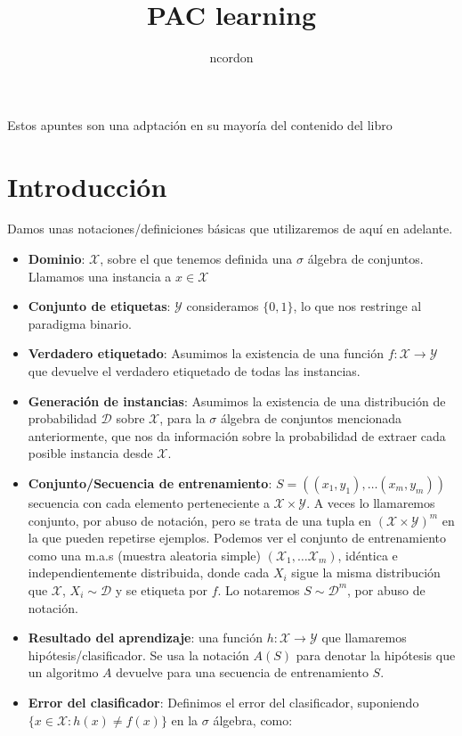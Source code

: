 \documentclass[11pt]{article}
\author{ncordon}
\date{}
\title{PAC learning}
\begin{document}

\maketitle
\tableofcontents

Estos apuntes son una adptación en su mayoría del contenido del libro \cite{shwartz_understanding_ml}
\section{Introducción}
\label{sec-1}
Damos unas notaciones/definiciones básicas que utilizaremos de aquí en adelante.

\begin{itemize}
\item \textbf{Dominio}: $\mathcal{X}$, sobre el que tenemos definida una $\sigma$ álgebra de conjuntos. Llamamos una instancia a $x\in \mathcal{X}$
\item \textbf{Conjunto de etiquetas}: $\mathcal{Y}$ consideramos $\{0,1\}$, lo que nos restringe al paradigma binario.
\item \textbf{Verdadero etiquetado}: Asumimos la existencia de una función $f: \mathcal{X} \rightarrow \mathcal{Y}$ que devuelve el verdadero etiquetado de todas las instancias.
\item \textbf{Generación de instancias}: Asumimos la existencia de una distribución de probabilidad $\mathcal{D}$ sobre $\mathcal{X}$, para la $\sigma$ álgebra de conjuntos mencionada anteriormente, que nos da información sobre la probabilidad de extraer cada posible instancia desde $\mathcal{X}$.
\item \textbf{Conjunto/Secuencia de entrenamiento}: $S = ((x_1,y_1), \ldots (x_m, y_m))$ secuencia con cada elemento perteneciente a $\mathcal{X}\times \mathcal{Y}$. A veces lo llamaremos conjunto, por abuso de notación, pero se trata de una tupla en $(\mathcal{X} \times \mathcal{Y})^m$ en la que pueden repetirse ejemplos. Podemos ver el conjunto de entrenamiento como una m.a.s (muestra aleatoria simple) $(\mathcal{X}_1,\ldots \mathcal{X}_m)$, idéntica e independientemente distribuida, donde cada $X_i$ sigue la misma distribución que $\mathcal{X}$, $X_i \sim \mathcal{D}$ y se etiqueta por $f$. Lo notaremos $S \sim \mathcal{D}^m$, por abuso de notación.
\item \textbf{Resultado del aprendizaje}: una función $h: \mathcal{X} \rightarrow \mathcal{Y}$ que llamaremos hipótesis/clasificador. Se usa la notación $A(S)$ para denotar la hipótesis que un algoritmo $A$ devuelve para una secuencia de entrenamiento $S$.
\item \textbf{Error del clasificador}: Definimos el error del clasificador, suponiendo $\{x\in \mathcal{X} : h(x) \neq f(x)\}$ en la $\sigma$ álgebra, como:
\end{itemize}
\end{document}

